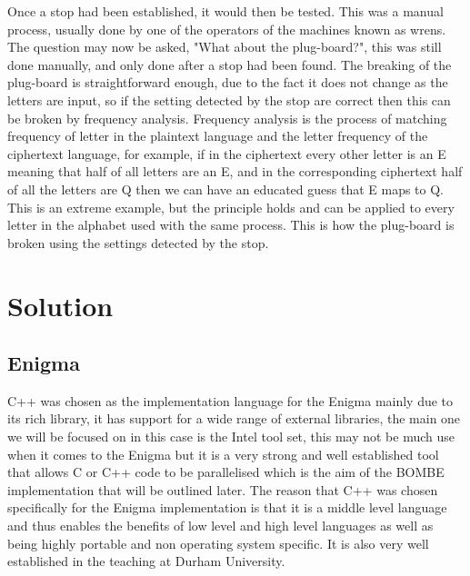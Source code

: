 \documentclass[12pt,a4paper]{article}
\begin{document}
Once a stop had been established, it would then be tested. This was a manual process, usually done by one of the operators of the machines known as wrens. The question may now be asked, "What about the plug-board?", this was still done manually, and only done after a stop had been found. The breaking of the plug-board is straightforward enough, due to the fact it does not change as the letters are input, so if the setting detected by the stop are correct then this can be broken by frequency analysis. Frequency analysis is the process of matching frequency of letter in the plaintext language and the letter frequency of the ciphertext language, for example, if in the ciphertext every other letter is an E meaning that half of all letters are an E, and in the corresponding ciphertext half of all the letters are Q then we can have an educated guess that E maps to Q. This is an extreme example, but the principle holds and can be applied to every letter in the alphabet used with the same process. This is how the plug-board is broken using the settings detected by the stop.

\section{Solution}

\subsection{Enigma}

C++ was chosen as the implementation language for the Enigma mainly due to its rich library, it has support for a wide range of external libraries, the main one we will be focused on in this case is the Intel tool set, this may not be much use when it comes to the Enigma but it is a very strong and well established tool that allows C or C++ code to be parallelised which is the aim of the BOMBE implementation that will be outlined later. The reason that C++ was chosen specifically for the Enigma implementation is that it is a middle level language and thus enables the benefits of low level and high level languages as well as being highly portable and non operating system specific. It is also very well established in the teaching at Durham University.\\
\end{document}
